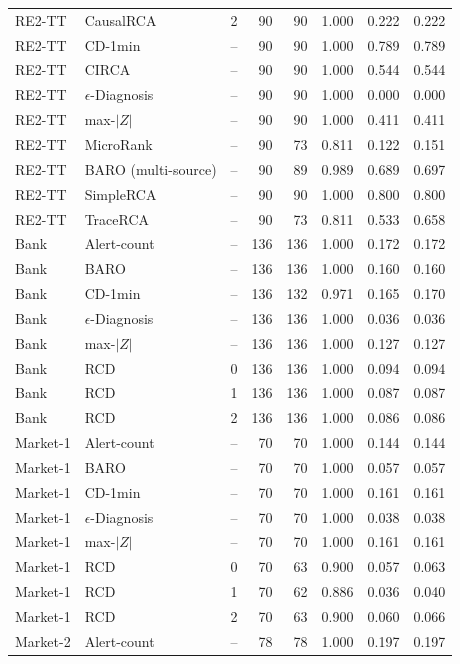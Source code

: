 {\begin{longtable}{llrrrrrr}
RE2-TT & CausalRCA & 2 & 90 & 90 & 1.000 & 0.222 & 0.222 \\
RE2-TT & CD-1min & -- & 90 & 90 & 1.000 & 0.789 & 0.789 \\
RE2-TT & CIRCA & -- & 90 & 90 & 1.000 & 0.544 & 0.544 \\
RE2-TT & $\epsilon$-Diagnosis & -- & 90 & 90 & 1.000 & 0.000 & 0.000 \\
RE2-TT & max-$|Z|$ & -- & 90 & 90 & 1.000 & 0.411 & 0.411 \\
RE2-TT & MicroRank & -- & 90 & 73 & 0.811 & 0.122 & 0.151 \\
RE2-TT & BARO (multi-source) & -- & 90 & 89 & 0.989 & 0.689 & 0.697 \\
RE2-TT & SimpleRCA & -- & 90 & 90 & 1.000 & 0.800 & 0.800 \\
RE2-TT & TraceRCA & -- & 90 & 73 & 0.811 & 0.533 & 0.658 \\
Bank & Alert-count & -- & 136 & 136 & 1.000 & 0.172 & 0.172 \\
Bank & BARO & -- & 136 & 136 & 1.000 & 0.160 & 0.160 \\
Bank & CD-1min & -- & 136 & 132 & 0.971 & 0.165 & 0.170 \\
Bank & $\epsilon$-Diagnosis & -- & 136 & 136 & 1.000 & 0.036 & 0.036 \\
Bank & max-$|Z|$ & -- & 136 & 136 & 1.000 & 0.127 & 0.127 \\
Bank & RCD & 0 & 136 & 136 & 1.000 & 0.094 & 0.094 \\
Bank & RCD & 1 & 136 & 136 & 1.000 & 0.087 & 0.087 \\
Bank & RCD & 2 & 136 & 136 & 1.000 & 0.086 & 0.086 \\
Market-1 & Alert-count & -- & 70 & 70 & 1.000 & 0.144 & 0.144 \\
Market-1 & BARO & -- & 70 & 70 & 1.000 & 0.057 & 0.057 \\
Market-1 & CD-1min & -- & 70 & 70 & 1.000 & 0.161 & 0.161 \\
Market-1 & $\epsilon$-Diagnosis & -- & 70 & 70 & 1.000 & 0.038 & 0.038 \\
Market-1 & max-$|Z|$ & -- & 70 & 70 & 1.000 & 0.161 & 0.161 \\
Market-1 & RCD & 0 & 70 & 63 & 0.900 & 0.057 & 0.063 \\
Market-1 & RCD & 1 & 70 & 62 & 0.886 & 0.036 & 0.040 \\
Market-1 & RCD & 2 & 70 & 63 & 0.900 & 0.060 & 0.066 \\
Market-2 & Alert-count & -- & 78 & 78 & 1.000 & 0.197 & 0.197 \\

\end{longtable}}
